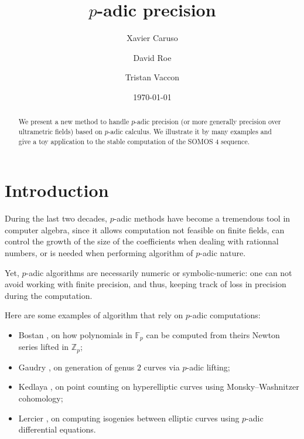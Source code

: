 \documentclass{amsart}
\begin{document}
\newtheorem{theo}{Theorem}[section]
\newtheorem{lem}[theo]{Lemma}
\newtheorem{prop}[theo]{Proposition}
\newtheorem{cor}[theo]{Corollary}
\newtheorem{quest}[theo]{Question}
\newtheorem{rem}[theo]{Remark}
\newtheorem{ex}[theo]{Example}
\theoremstyle{definition}
\newtheorem{deftn}[theo]{Definition}
\newtheorem{rmk}[theo]{Remark}

\newcommand{\Z}{\mathbb Z}
\newcommand{\Zp}{\Z_p}
\newcommand{\Q}{\mathbb Q}
\newcommand{\Qp}{\Q_p}
\newcommand{\R}{\mathbb R}
\renewcommand{\O}{\mathcal O}
\newcommand{\XX}{\mathbf X}

\newcommand{\val}{\text{\rm val}}
\renewcommand{\prec}{\text{\rm prec}}

\def\todo#1{\ \!\!{\color{red} #1}}
\def\todofor#1#2{\ \!\!{\color{purple} {\bf #1}: #2}}

\title{$p$-adic precision}
\author{Xavier Caruso}
\author{David Roe}
\author{Tristan Vaccon}
\date\today

\maketitle
\begin{abstract}
We present a new method to handle $p$-adic precision (or more generally
precision over ultrametric fields) based on $p$-adic calculus.
We illustrate it by many examples and give a toy application to the
stable computation of the SOMOS 4 sequence.
\end{abstract}

\setcounter{tocdepth}{1}
\tableofcontents

\section{Introduction}

During the last two decades, $p$-adic methods have become a tremendous tool in computer algebra, since it allows computation not feasible on finite fields, can control the growth of the size of the coefficients when dealing with rationnal numbers, or is needed when performing algorithm of $p$-adic nature.

Yet, $p$-adic algorithms are necessarily numeric or symbolic-numeric: one can not avoid working with finite precision, and thus, keeping track of loss in precision during the computation.

Here are some examples of algorithm that rely on $p$-adic computations:
\begin{itemize}
\item Bostan \cite{Bostan}, on how polynomials in $\mathbb{F}_p$ can be computed from theirs Newton series lifted in $\mathbb{Z}_p$;
\item Gaudry \cite{Gaudry}, on generation of genus $2$ curves via $p$-adic lifting;
\item Kedlaya \cite{Kedlaya}, on point counting on hyperelliptic curves using Monsky--Washnitzer cohomology;
\item Lercier \cite{Lercier}, on computing isogenies between elliptic curves using $p$-adic differential equations.
\end{itemize}
\end{document}
